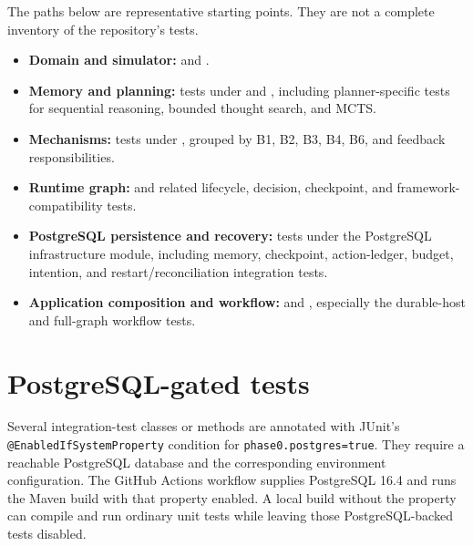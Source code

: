 The paths below are representative starting points. They are not a complete inventory of the repository's tests.

\begin{itemize}
  \item \textbf{Domain and simulator:}  and .
  \item \textbf{Memory and planning:} tests under  and , including planner-specific tests for sequential reasoning, bounded thought search, and MCTS.
  \item \textbf{Mechanisms:} tests under , grouped by B1, B2, B3, B4, B6, and feedback responsibilities.
  \item \textbf{Runtime graph:}  and related lifecycle, decision, checkpoint, and framework-compatibility tests.
  \item \textbf{PostgreSQL persistence and recovery:} tests under the PostgreSQL infrastructure module, including memory, checkpoint, action-ledger, budget, intention, and restart/reconciliation integration tests.
  \item \textbf{Application composition and workflow:}  and , especially the durable-host and full-graph workflow tests.
\end{itemize}

\section{PostgreSQL-gated tests}

Several integration-test classes or methods are annotated with JUnit's \texttt{@EnabledIfSystemProperty} condition for \texttt{phase0.postgres=true}. They require a reachable PostgreSQL database and the corresponding environment configuration. The GitHub Actions workflow supplies PostgreSQL 16.4 and runs the Maven build with that property enabled. A local build without the property can compile and run ordinary unit tests while leaving those PostgreSQL-backed tests disabled.

